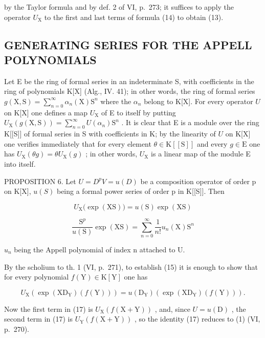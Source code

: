 by the Taylor formula and by def. 2 of VI, p.~273; it suffices to apply the operator \(U_{\mathrm{X}}\) to the first and last terms of formula (14) to obtain (13).

\subsection{GENERATING SERIES FOR THE APPELL POLYNOMIALS}

Let E be the ring of formal series in an indeterminate S, with coefficients in the ring of polynomials K{[}X{]} (Alg., IV. 41); in other words, the ring of formal series \(g(\mathrm{X}, \mathrm{S}) = \sum_{n=0}^{\infty} \alpha_n(\mathrm{X}) \mathrm{S}^n\) where the \(\alpha_n\) belong to K{[}X{]}. For every operator \(U\) on K{[}X{]} one defines a map \(U_{\mathrm{X}}\) of E to itself by putting \(U_{\mathrm{X}}(g(\mathrm{X}, \mathrm{S})) = \sum_{n=0}^{\infty} U(\alpha_n)\mathrm{S}^n\) . It is clear that E is a module over the ring K{[}{[}S{]}{]} of formal series in S with coefficients in K; by the linearity of \(U\) on K{[}X{]} one verifies immediately that for every element \(\theta \in \mathrm{K}[[\mathrm{S}]]\) and every \(g \in \mathrm{E}\) one has \(U_{\mathrm{X}}(\theta g) = \theta U_{\mathrm{X}}(g)\) ; in other words, \(U_{\mathrm{X}}\) is a linear map of the module E into itself.

PROPOSITION 6. Let \(U = D^{p}V = u(D)\) be a composition operator of order p on K{[}X{]}, \(u(S)\) being a formal power series of order p in K{[}{[}S{]}{]}. Then

\[
U _ {\mathrm{X}} \big (\exp (\mathrm{XS}) \big) = u (\mathrm{S}) \exp (\mathrm{XS})\tag{15}
\]

\[
\frac {\mathrm{S} ^ {p}}{u (\mathrm{S})} \exp (\mathrm{XS}) = \sum_ {n = 0} ^ {\infty} \frac {1}{n !} u _ {n} (\mathrm{X}) \mathrm{S} ^ {n}\tag{16}
\]

\(u_{n}\) being the Appell polynomial of index n attached to U.

By the scholium to th. 1 (VI, p.~271), to establish (15) it is enough to show that for every polynomial \(f(\mathrm{Y}) \in \mathrm{K}[\mathrm{Y}]\) one has

\[
U _ {\mathrm{X}} \left(\exp (\mathrm{XD} _ {\mathrm{Y}}) (f (\mathrm{Y}))\right) = u (\mathrm{D} _ {\mathrm{Y}}) \left(\exp (\mathrm{XD} _ {\mathrm{Y}}) (f (\mathrm{Y}))\right).\tag{17}
\]

Now the first term in (17) is \(U_{\mathrm{X}}(f(\mathrm{X} + \mathrm{Y}))\) , and, since \(U = u(\mathrm{D})\) , the second term in (17) is \(U_{\mathrm{Y}}(f(\mathrm{X} + \mathrm{Y}))\) , so the identity (17) reduces to (1) (VI, p.~270).

